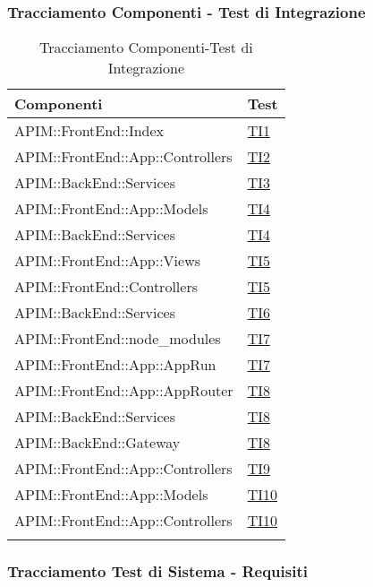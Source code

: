 \subsubsection{Tracciamento Componenti - Test di Integrazione}

\normalsize
\begin{longtable}{|>{\centering}m{8cm}|m{5cm}<{\centering}|}
	\hline \rowcolor{Gray}
	\textbf{Componenti} & \textbf{Test}\\
	\hline
	\endhead
	APIM::FrontEnd::Index & \hyperlink{TI1}{TI1} \\ \hline
	APIM::FrontEnd::App::Controllers & \hyperlink{TI2}{TI2} \\ \hline
	APIM::BackEnd::Services & \hyperlink{TI3}{TI3} \\ \hline
	APIM::FrontEnd::App::Models & \hyperlink{TI4}{TI4}\\
	\hline
	APIM::BackEnd::Services & \hyperlink{TI4}{TI4} \\ \hline
	APIM::FrontEnd::App::Views & \hyperlink{TI5}{TI5} \\
	\hline
	APIM::FrontEnd::Controllers & \hyperlink{TI5}{TI5} \\
	\hline
	APIM::BackEnd::Services & \hyperlink{TI6}{TI6} \\ \hline
	APIM::FrontEnd::node\_modules & \hyperlink{TI7}{TI7} \\
	\hline
	APIM::FrontEnd::App::AppRun & \hyperlink{TI7}{TI7} \\
	\hline
	APIM::FrontEnd::App::AppRouter & \hyperlink{TI8}{TI8} \\ \hline
	APIM::BackEnd::Services & \hyperlink{TI8}{TI8} \\
	\hline
	APIM::BackEnd::Gateway & \hyperlink{TI8}{TI8} \\ \hline
	APIM::FrontEnd::App::Controllers & \hyperlink{TI9}{TI9} \\
	\hline
	APIM::FrontEnd::App::Models & \hyperlink{TI10}{TI10} \\
	\hline
	APIM::FrontEnd::App::Controllers & \hyperlink{TI10}{TI10} \\
	\hline
	
	\caption[Tracciamento Componenti-Test di Integrazione]{Tracciamento Componenti-Test di Integrazione}
	\label{tabella:componenti-ti}
\end{longtable}
\clearpage

\subsubsection{Tracciamento Test di Sistema - Requisiti}

